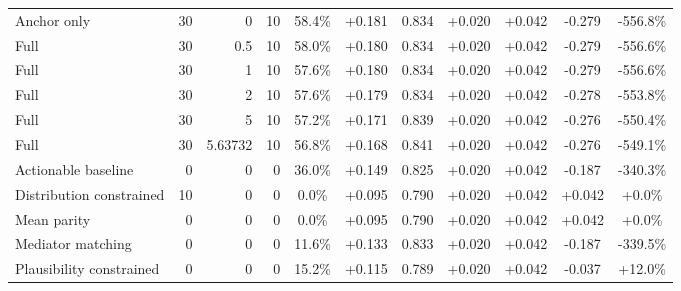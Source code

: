 \begin{table}[htbp]
\begin{tabular}{lrrrccccccc}
Anchor only & 30 & 0 & 10 & 58.4\% & +0.181 & 0.834 & +0.020 & +0.042 & -0.279 & -556.8\% \\
Full & 30 & 0.5 & 10 & 58.0\% & +0.180 & 0.834 & +0.020 & +0.042 & -0.279 & -556.6\% \\
Full & 30 & 1 & 10 & 57.6\% & +0.180 & 0.834 & +0.020 & +0.042 & -0.279 & -556.6\% \\
Full & 30 & 2 & 10 & 57.6\% & +0.179 & 0.834 & +0.020 & +0.042 & -0.278 & -553.8\% \\
Full & 30 & 5 & 10 & 57.2\% & +0.171 & 0.839 & +0.020 & +0.042 & -0.276 & -550.4\% \\
Full & 30 & 5.63732 & 10 & 56.8\% & +0.168 & 0.841 & +0.020 & +0.042 & -0.276 & -549.1\% \\
Actionable baseline & 0 & 0 & 0 & 36.0\% & +0.149 & 0.825 & +0.020 & +0.042 & -0.187 & -340.3\% \\
Distribution constrained & 10 & 0 & 0 & 0.0\% & +0.095 & 0.790 & +0.020 & +0.042 & +0.042 & +0.0\% \\
Mean parity & 0 & 0 & 0 & 0.0\% & +0.095 & 0.790 & +0.020 & +0.042 & +0.042 & +0.0\% \\
Mediator matching & 0 & 0 & 0 & 11.6\% & +0.133 & 0.833 & +0.020 & +0.042 & -0.187 & -339.5\% \\
Plausibility constrained & 0 & 0 & 0 & 15.2\% & +0.115 & 0.789 & +0.020 & +0.042 & -0.037 & +12.0\% \\
\bottomrule
\end{tabular}
\end{table}